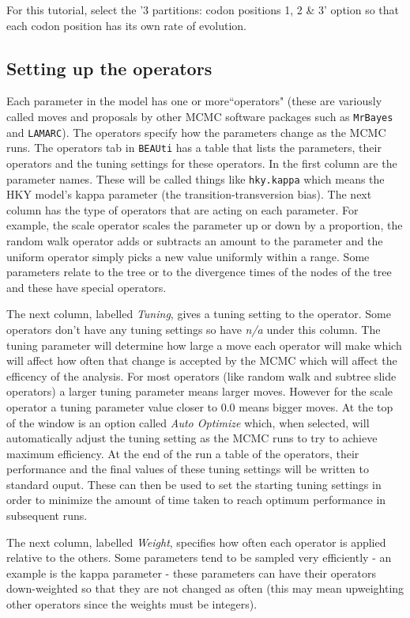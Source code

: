 \documentclass[cup7b, english]{cupbook}
\begin{document}
For this tutorial, select the '3 partitions: codon positions 1, 2 \& 3' option so that each codon
position has its own rate of evolution.

\subsection{Setting up the operators}

Each parameter in the model has one or more``operators" (these are variously called moves and
proposals by other MCMC software packages such as \texttt{MrBayes} and \texttt{LAMARC}). The operators specify how
the parameters change as the MCMC runs. The operators tab in \texttt{BEAUti} has a table that lists the parameters,
their operators and the tuning settings for these operators. In the first column are the parameter names.
These will be called things like \texttt{hky.kappa} which means the HKY model's kappa parameter (the
transition-transversion bias). The next column has the type of operators that are acting on each
parameter. For example, the scale operator scales the parameter up or down by a proportion, the
random walk operator adds or subtracts an amount to the parameter and the uniform operator simply
picks a new value uniformly within a range. Some parameters relate to the tree or to the divergence
times of the nodes of the tree and these have special operators.

The next column, labelled {\it Tuning}, gives a tuning setting to the operator. Some operators
don't have any tuning settings so have {\it n/a} under this column. The tuning parameter will
determine how large a move each operator will make which will affect how often that change is
accepted by the MCMC which will affect the efficency of the analysis. For most operators (like
random walk and subtree slide operators) a larger tuning parameter means larger moves. However
for the scale operator a tuning parameter value closer to 0.0 means bigger moves. At the top of
the window is an option called {\it Auto Optimize} which, when selected, will automatically adjust
the tuning setting as the MCMC runs to try to achieve maximum efficiency. At the end of the run
a table of the operators, their performance and the final values of these tuning settings will be
written to standard ouput. These can then be used to set the starting tuning settings in order to
minimize the amount of time taken to reach optimum performance in subsequent runs.

The next column, labelled {\it Weight}, specifies how often each operator is applied relative
to the others. Some parameters tend to be sampled very efficiently - an example is the kappa
parameter - these parameters can have their operators down-weighted so that they are not changed
as often (this may mean upweighting other operators since the weights must be integers).
\end{document}
